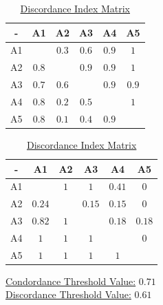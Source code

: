 \begin{table}[!ht]
    \parbox{0.49\textwidth}{
        \centering
        \caption{
            \hyperref
            [eq:concordance]
            {Concordance Index Matrix}
        }
        \label{tab:cim}

        \begin{tabular}{|c|c|c|c|c|c|}
            \toprule
            -  & A1    & A2    & A3    & A4    & A5    \\

            \midrule
            A1 &       & $0.3$ & $0.6$ & $0.9$ & $1$   \\
            A2 & $0.8$ &       & $0.9$ & $0.9$ & $1$   \\
            A3 & $0.7$ & $0.6$ &       & $0.9$ & $0.9$ \\
            A4 & $0.8$ & $0.2$ & $0.5$ &       & $1$   \\
            A5 & $0.8$ & $0.1$ & $0.4$ & $0.9$ &       \\

            \bottomrule
        \end{tabular}
    }
    \hfill
    \parbox{0.49\textwidth}{
        \centering
        \caption{
            \hyperref
            [eq:discordance0]
            {Discordance Index Matrix}
        }
        \label{tab:dim}

        \begin{tabular}{|c|c|c|c|c|c|}
            \toprule
            -  & A1     & A2  & A3     & A4     & A5     \\

            \midrule
            A1 &        & $1$ & $1$    & $0.41$ & $0$    \\
            A2 & $0.24$ &     & $0.15$ & $0.15$ & $0$    \\
            A3 & $0.82$ & $1$ &        & $0.18$ & $0.18$ \\
            A4 & $1$    & $1$ & $1$    &        & $0$    \\
            A5 & $1$    & $1$ & $1$    & $1$    &        \\

            \bottomrule
        \end{tabular}
    }
\end{table}

\begin{multicols}{2}
    \centering

    \hyperref
    [eq:concordance_threshold]
    {Condordance Threshold Value:}
    $0.71$ \\

    \hyperref
    [eq:discordance_threshold]
    {Discordance Threshold Value:}
    $0.61$ \\
\end{multicols}

